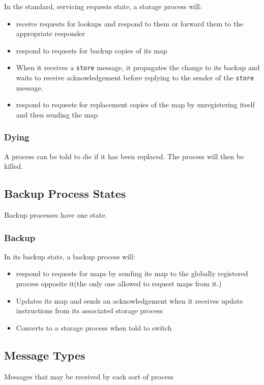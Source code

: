 \documentclass[a4paper]{article}
\begin{document}
In the standard, servicing requests state, a storage process will:
\begin{itemize}
\item receive requests for lookups and respond to them or forward them to the appropriate responder
\item respond to requests for backup copies of its map
\item When it receives a {\tt store} message, it propagates the change to its backup and waits to receive acknowledgement before replying to the sender of the {\tt store} message.
\item respond to requests for replacement copies of the map by unregistering itself and then sending the map
\end{itemize}

\subsubsection{Dying}

A process can be told to die if it has been replaced. The process will then be killed.


\subsection{Backup Process States}

Backup processes have one state.

\subsubsection{Backup}

In its backup state, a backup process will:
\begin{itemize}
\item respond to requests for maps by sending its map to the globally registered process opposite it(the only one allowed to request maps from it.)
\item Updates its map and sends an acknowledgement when it receives update instructions from its associated storage process
\item Converts to a storage process when told to switch
\end{itemize}

\subsection{Message Types}

Messages that may be received by each sort of process
\end{document}
